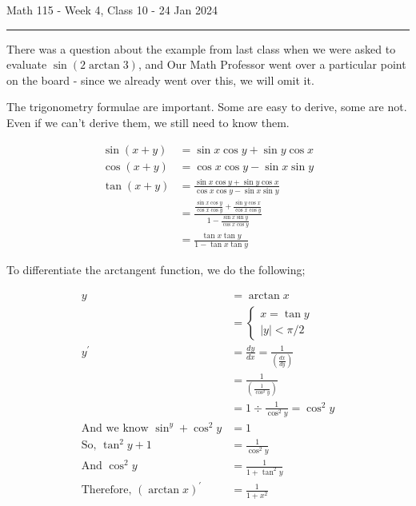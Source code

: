 \documentclass{article}
\begin{document}
Math 115 - Week 4, Class 10 - 24 Jan 2024
\hrule

\vspace{10pt}

There was a question about the example from last class when we were asked to evaluate $\sin(2\arctan3)$, and Our Math Professor went over a particular point on the board - since we already went over this, we will omit it.

\vspace{10pt}

The trigonometry formulae are important. Some are easy to derive, some are not. Even if we can't derive them, we still need to know them.

\begin{align*}
\sin(x+y)&=\sin x\cos y+\sin y\cos x\\
\cos(x+y)&=\cos x\cos y-\sin x\sin y\\
\tan(x+y)&=\frac{\sin x\cos y+\sin y\cos x}{\cos x\cos y-\sin x\sin y}\\
&=\frac{\frac{\sin x\cos y}{\cos x\cos y}+\frac{\sin y\cos x}{\cos x\cos y}}{1-\frac{\sin x\sin y}{\cos x\cos y}}\\
&=\frac{\tan x\tan y}{1-\tan x\tan  y}
\end{align*}

\vspace{10pt}

To differentiate the arctangent function, we do the following;

\begin{align*}
y&=\arctan x\\
&=\left\{\begin{array}{c}x=\tan y\\|y|<\pi/2\end{array}\right.\\
y^\prime&=\frac{dy}{dx}=\frac{1}{\left(\frac{dx}{dy}\right)}\\
&=\frac{1}{\left(\frac{1}{\cos^2y}\right)}\\
&=1\div\frac{1}{\cos^2y}=\cos^2y\\
\mbox{And we know }\sin^y+\cos^2y&=1\\
\mbox{So, }\tan^2y+1&=\frac{1}{\cos^2y}\\
\mbox{And }\cos^2y&=\frac{1}{1+\tan^2y}\\
\mbox{Therefore, }(\arctan x)^\prime&=\frac{1}{1+x^2}
\end{align*}

\vspace{10pt}
\end{document}
